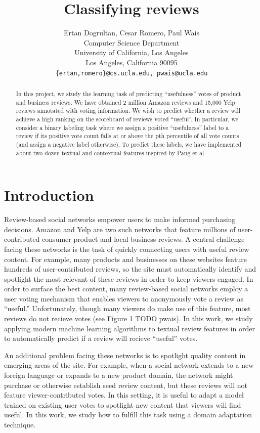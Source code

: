 \documentclass[letterpaper]{article}
\title{Classifying reviews}
\author{Ertan Dogrultan, Cesar Romero, Paul Wais\\
Computer Science Department \\
University of California, Los Angeles\\
Los Angeles, California 90095\\
\texttt{\{ertan,romero\}@cs.ucla.edu, pwais@ucla.edu}}
\begin{document}
\maketitle
\begin{abstract}
In this project, we study the learning task of predicting ``usefulness''
votes of product and business reviews.  We have obtained 2 million
Amazon reviews and 15,000 Yelp reviews annotated with voting
information.  We wish to predict whether a review will achieve a high
ranking on the scoreboard of reviews voted ``useful''.  In particular,
we consider a binary labeling task where we assign a positive
``usefulness'' label to a review if its positive vote count falls at or
above the pth percentile of all vote counts (and assign a negative
label otherwise).  To predict these labels, we have implemented about
two dozen textual and contextual features inspired by Pang et al. \cite{PangSentimentClassification}
\end{abstract}

\section{Introduction}
\label{sec:introduction}

Review-based social networks empower users to make informed purchasing decisions.  Amazon and Yelp are 
two such networks that feature millions of user-contributed consumer product and local business reviews.  
A central challenge facing these networks is the task of quickly connecting users with useful 
review content.  For example, many products and businesses on these websites feature hundreds of
user-contributed reviews, so the site must automatically identify and spotlight the most relevant 
of these reviews in order to keep viewers engaged.  In order to surface the best content, many 
review-based social networks employ a user voting mechanism that enables viewers to anonymously 
vote a review as ``useful.''  Unfortunately, though many viewers do make use of this feature, most 
reviews do not recieve votes (see Figure 1 TODO pwais).  In this work, we study applying modern 
machine learning algorithms to textual review features in order to automatically predict if a 
review will recieve ``useful'' votes.

An additional problem facing these networks is to spotlight quality content in emerging 
areas of the site.  For example, when a social network extends to a new foreign language or
expands to a new product domain, the network might purchase or otherwise establish seed 
review content, but these reviews will not feature viewer-contributed votes.  In this setting, 
it is useful to adapt a model trained on existing user votes to spotlight new content 
that viewers will find useful.  In this work, we study how to fulfill this task using a
domain adaptation technique.  
\end{document}
